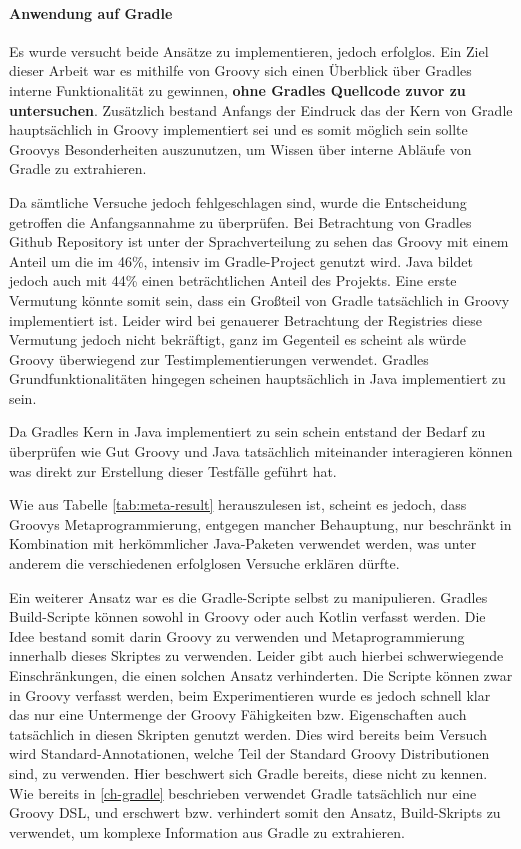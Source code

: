 \paragraph{Anwendung auf Gradle}

Es wurde versucht beide Ansätze zu implementieren, jedoch erfolglos.
Ein Ziel dieser Arbeit war es mithilfe von Groovy sich einen Überblick über Gradles interne Funktionalität zu  gewinnen, \textbf{ohne Gradles Quellcode zuvor zu untersuchen}. 
Zusätzlich bestand Anfangs der Eindruck das der Kern von Gradle hauptsächlich in Groovy implementiert sei und es somit möglich sein sollte Groovys Besonderheiten auszunutzen, um Wissen über interne Abläufe von Gradle zu extrahieren.

Da sämtliche Versuche jedoch fehlgeschlagen sind, wurde die Entscheidung getroffen die Anfangsannahme zu überprüfen.
Bei Betrachtung von Gradles Github Repository  ist unter der Sprachverteilung zu sehen das Groovy mit einem Anteil um die im 46\%, intensiv im Gradle-Project genutzt wird. 
Java bildet jedoch auch mit 44\% einen beträchtlichen Anteil des Projekts.
Eine erste Vermutung könnte somit sein, dass ein Großteil von Gradle tatsächlich in Groovy implementiert ist.
Leider wird bei genauerer Betrachtung der Registries diese Vermutung jedoch nicht bekräftigt, ganz im Gegenteil es scheint als würde Groovy überwiegend zur Testimplementierungen verwendet.
Gradles Grundfunktionalitäten hingegen scheinen hauptsächlich in Java implementiert zu sein.

Da Gradles Kern in Java implementiert zu sein schein entstand der Bedarf zu überprüfen wie Gut Groovy und Java tatsächlich miteinander interagieren können was direkt zur Erstellung dieser Testfälle geführt hat.

Wie aus Tabelle \ref{tab:meta-result} herauszulesen ist, scheint es jedoch, dass Groovys Metaprogrammierung, entgegen mancher Behauptung, nur beschränkt in Kombination mit herkömmlicher Java-Paketen verwendet werden, was unter anderem die verschiedenen erfolglosen Versuche erklären dürfte.

Ein weiterer Ansatz war es die Gradle-Scripte selbst zu manipulieren.
Gradles Build-Scripte können sowohl in Groovy oder auch Kotlin verfasst werden.
Die Idee bestand somit darin Groovy zu verwenden und Metaprogrammierung innerhalb dieses Skriptes zu verwenden.
Leider gibt auch hierbei schwerwiegende Einschränkungen, die einen solchen Ansatz verhinderten.
Die Scripte können zwar in Groovy verfasst werden, beim Experimentieren wurde es jedoch schnell klar das nur eine Untermenge der Groovy Fähigkeiten bzw. Eigenschaften auch tatsächlich in diesen Skripten genutzt werden.
Dies wird bereits beim Versuch wird Standard-Annotationen, welche Teil der Standard Groovy Distributionen sind, zu verwenden.
Hier beschwert sich Gradle bereits, diese nicht zu kennen.
Wie bereits in \ref{ch-gradle} beschrieben verwendet Gradle tatsächlich nur eine Groovy DSL, und erschwert bzw. verhindert somit den Ansatz, Build-Skripts zu verwendet, um komplexe Information aus Gradle zu extrahieren.
